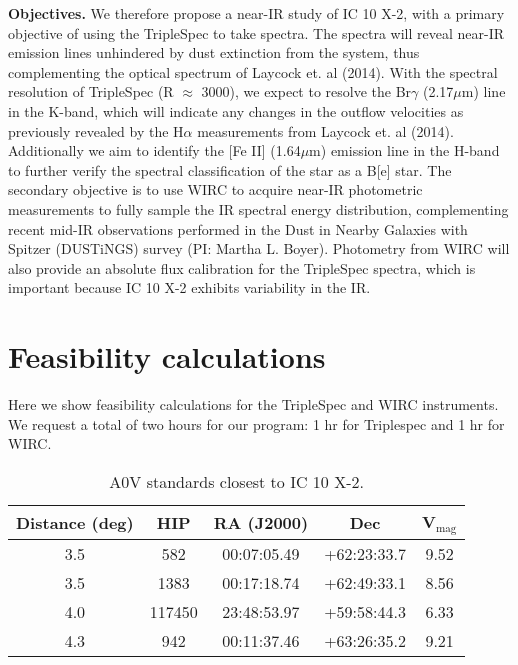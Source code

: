 \documentclass{article}
\begin{document}
\noindent\textbf{Objectives.} We therefore propose a near-IR study of IC 10 X-2, with a primary objective of using the TripleSpec to take spectra. The spectra will reveal near-IR emission lines unhindered by dust extinction from the system, thus complementing the optical spectrum of Laycock et. al (2014). With the spectral resolution of TripleSpec (R $\approx$ 3000), we expect to resolve the Br$\gamma$ (2.17$\mu$m) line in the K-band, which will indicate any changes in the outflow velocities as previously revealed by the H$\alpha$ measurements from Laycock et. al (2014). Additionally we aim to identify the [Fe II] (1.64$\mu$m) emission line in the H-band to further verify the spectral classification of the star as a B[e] star.  
The secondary objective is to use WIRC to acquire near-IR photometric measurements to fully sample the IR spectral energy distribution, complementing recent mid-IR observations performed in the Dust in Nearby Galaxies with Spitzer (DUSTiNGS) survey (PI: Martha L. Boyer). Photometry from WIRC will also provide an absolute flux calibration for the TripleSpec spectra, which is important because IC 10 X-2 exhibits variability in the IR. 

\vspace{-2ex}
\section{Feasibility calculations}
Here we show feasibility calculations for the TripleSpec and WIRC instruments. We request a total of two hours for our program: 1 hr for Triplespec and 1 hr for WIRC. 

\begin{wraptable}{l}{10cm}
	\vspace{-2ex}
	\caption{A0V standards closest to IC 10 X-2.}
	\label{A0V standards}
	\begin{tabular}{|c|c|c|c|c|}
	\hline
Distance (deg) & HIP    & RA (J2000)  & Dec         & V$_\textrm{mag}$ \\ \hline
3.5            & 582    & 00:07:05.49 & +62:23:33.7 & 9.52  \\ \hline
3.5            & 1383   & 00:17:18.74 & +62:49:33.1 & 8.56  \\ \hline
4.0            & 117450 & 23:48:53.97 & +59:58:44.3 & 6.33  \\ \hline
4.3            & 942    & 00:11:37.46 & +63:26:35.2 & 9.21  \\ \hline
	\end{tabular}
\end{wraptable}
\end{document}

